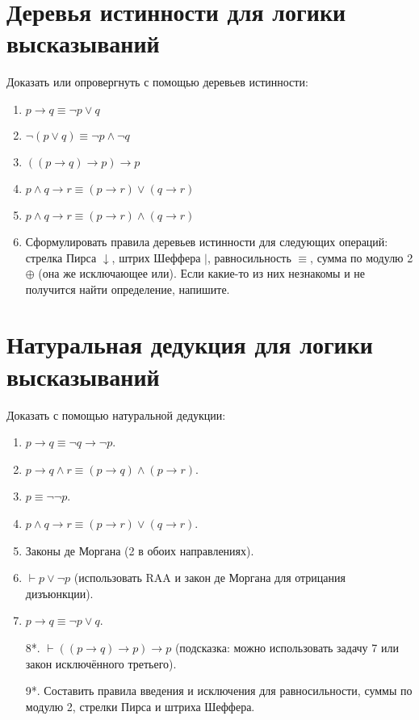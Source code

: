 \documentclass{article}
\begin{document}
\section{Деревья истинности для логики высказываний}
Доказать или опровергнуть с помощью деревьев истинности:
\begin{enumerate}
    \item $p \to q \equiv \neg p \vee q$
    \item $\neg (p \vee q) \equiv \neg p \wedge \neg q$
    \item $((p \to q) \to p) \to p$
    \item $p \wedge q \to r \equiv (p \to r) \vee (q \to r)$
    \item $p \wedge q \to r \equiv (p \to r) \wedge (q \to r)$
    \item Сформулировать правила деревьев истинности для следующих операций: стрелка Пирса $\downarrow$, штрих Шеффера $\mid$, равносильность $\equiv$, сумма по модулю 2 $\oplus$ (она же исключающее или). Если какие-то из них незнакомы и не получится найти определение, напишите.
\end{enumerate}

\section{Натуральная дедукция для логики высказываний}
Доказать с помощью натуральной дедукции:
\begin{enumerate}
    \item $p \to q \equiv \neg q \to \neg p$.
    \item $p \to q \land r \equiv (p \to q) \land (p \to r)$.
    \item $p \equiv \neg \neg p$.
    \item $p \land q \to r \equiv (p \to r) \lor (q \to r)$.
    \item Законы де Моргана (2 в обоих направлениях).
    \item $\vdash p \lor \neg p$ (использовать RAA и закон де Моргана для отрицания дизъюнкции).
    \item $p \to q \equiv \neg p \lor q$.
    \item[8*.] $\vdash ((p \to q) \to p) \to p$ (подсказка: можно использовать задачу 7 или закон исключённого третьего).
    \item[9*.] Составить правила введения и исключения для равносильности, суммы по модулю 2, стрелки Пирса и штриха Шеффера.
\end{enumerate}
\end{document}
